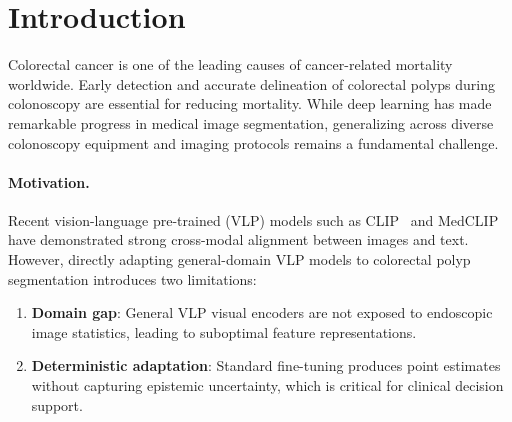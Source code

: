 
\section{Introduction}
\label{sec:intro}

Colorectal cancer is one of the leading causes of cancer-related mortality worldwide.
Early detection and accurate delineation of colorectal polyps during colonoscopy are
essential for reducing mortality. While deep learning has made remarkable progress in
medical image segmentation, generalizing across diverse colonoscopy equipment and
imaging protocols remains a fundamental challenge.

\paragraph{Motivation.}
Recent vision-language pre-trained (VLP) models such as CLIP~\cite{radford2021clip}
and MedCLIP~\cite{wang2022medclip} have demonstrated strong cross-modal alignment
between images and text. However, directly adapting general-domain VLP models to
colorectal polyp segmentation introduces two limitations:
\begin{enumerate}
    \item \textbf{Domain gap}: General VLP visual encoders are not exposed to
          endoscopic image statistics, leading to suboptimal feature representations.
    \item \textbf{Deterministic adaptation}: Standard fine-tuning produces point
          estimates without capturing epistemic uncertainty, which is critical for
          clinical decision support.
\end{enumerate}

